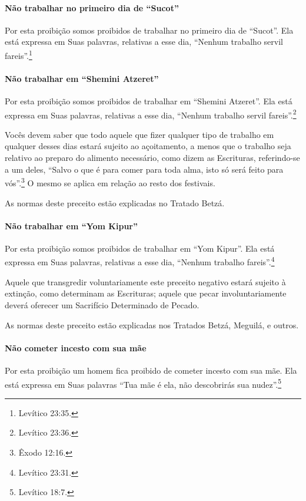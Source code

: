 \paragraph{Não trabalhar no primeiro dia de ``Sucot''}

Por esta proibição somos proibidos de trabalhar no primeiro dia de
``Sucot''. Ela está expressa em Suas palavras, relativas a esse dia,
``Nenhum trabalho servil fareis''.\footnote{Levítico 23:35.}

\paragraph{Não trabalhar em ``Shemini Atzeret''}

Por esta proibição somos proibidos de trabalhar em ``Shemini Atzeret''.
Ela está expressa em Suas palavras, relativas a esse dia, ``Nenhum
trabalho servil fareis''.\footnote{Levítico 23:36.}

Vocês devem saber que todo aquele que fizer qualquer tipo de trabalho em
qualquer desses dias estará sujeito ao açoitamento, a menos que o
trabalho seja relativo ao preparo do alimento necessário, como dizem as
Escrituras, referindo-se a um deles, ``Salvo o que é
para comer para toda alma, isto só será feito para vós''.\footnote{Êxodo 12:16.}
O mesmo se aplica em relação ao resto dos festivais.

As normas deste preceito estão explicadas no Tratado Betzá.

\paragraph{Não trabalhar em ``Yom Kipur''}

Por esta proibição somos proibidos de trabalhar em ``Yom Kipur''. Ela
está expressa em Suas palavras, relativas a esse dia, ``Nenhum trabalho
fareis''.\footnote{Levítico 23:31.}

Aquele que transgredir voluntariamente este preceito negativo estará
sujeito à extinção, como determinam as Escrituras; aquele que pecar
involuntariamente deverá oferecer um Sacrifício Determinado de Pecado.

As normas deste preceito estão explicadas nos Tratados Betzá, Meguilá, e
outros.

\paragraph{Não cometer incesto com sua mãe}

Por esta proibição um homem fica proibido de cometer incesto com sua
mãe. Ela está expressa em Suas palavras ``Tua mãe é ela, não descobrirás
sua nudez''.\footnote{Levítico 18:7.}

